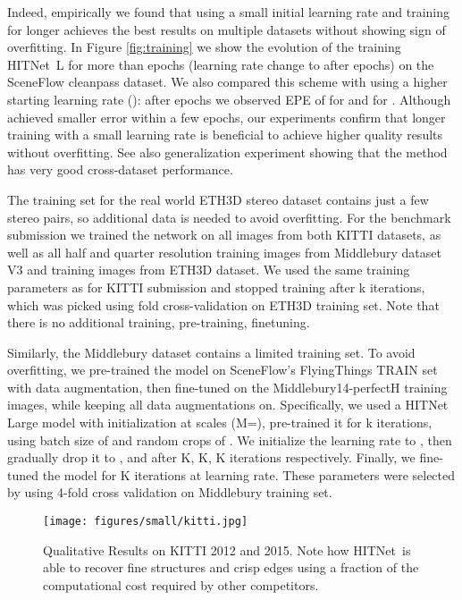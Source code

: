 \documentclass[final]{cvpr}
\newcommand{\algoname}{HITNet}
\begin{document}
Indeed, empirically we found that using a small initial learning rate  and training for longer achieves the best results on multiple datasets without showing sign of overfitting. In Figure \ref{fig:training} we show the evolution of the training \algoname \ L for more than  epochs (learning rate change to  after  epochs) on the SceneFlow cleanpass dataset. We also compared this scheme with using a higher starting learning rate (): after  epochs we observed EPE of  for  and  for . Although  achieved smaller error within a few epochs, our experiments confirm that longer training with a small learning rate is beneficial to achieve higher quality results without overfitting. See also generalization experiment showing that the method has very good cross-dataset performance.


The training set for the real world ETH3D stereo dataset \cite{schoeps2017cvpr} contains just a few stereo pairs, so additional data is needed to avoid overfitting. For the benchmark submission we trained the network on all  images from both KITTI datasets, as well as all half and quarter resolution training images from Middlebury dataset V3 \cite{middlebury14} and training images from ETH3D dataset. We used the same training parameters as for KITTI submission and stopped training after k iterations, which was picked using  fold cross-validation on ETH3D training set. Note that there is no additional training, pre-training, finetuning.

Similarly, the Middlebury dataset \cite{middlebury14} contains a limited training set. To avoid overfitting, we pre-trained the model on SceneFlow's FlyingThings TRAIN set with data augmentation, then fine-tuned on the  Middlebury14-perfectH training images, while keeping all data augmentations on. Specifically, we used a HITNet Large model with initialization at  scales (M=), pre-trained it for k iterations, using batch size of  and random crops of . 
We initialize the learning rate to , then gradually drop it to ,  and  after K, K, K iterations respectively. Finally, we fine-tuned the model for K iterations at  learning rate. These parameters were selected by using 4-fold cross validation on Middlebury training set.

\begin{figure}[t]
    \centering
    \texttt{[image: figures/small/kitti.jpg]}
    \caption{Qualitative Results on KITTI 2012 and 2015. Note how \algoname \ is able to recover fine structures and crisp edges using a fraction of the computational cost required by other competitors.}
    \label{fig:kitti}
\end{figure}
\end{document}
